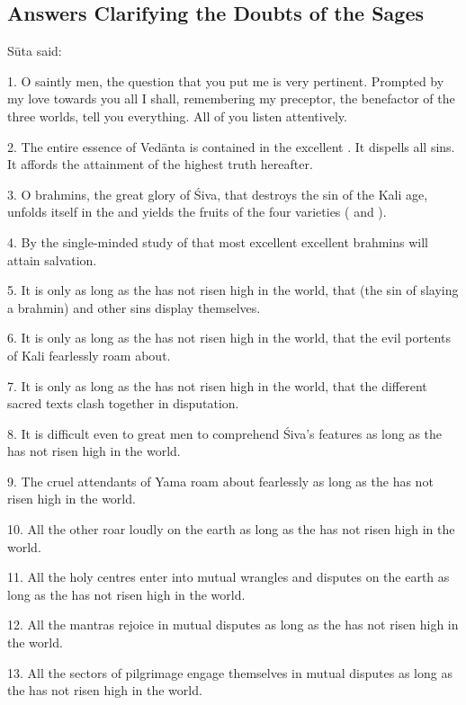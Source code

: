 \subsection{Answers Clarifying the Doubts of the Sages}

Sūta said:

1. O saintly men, the question that you put me is very pertinent. Prompted by my
love towards you all I shall, remembering my preceptor, the benefactor of the
three worlds, tell you everything. All of you listen attentively.

2. The entire essence of Vedānta is contained in the excellent .
It dispells all sins. It affords the attainment of the highest truth hereafter.

3. O brahmins, the great glory of Śiva, that destroys the sin of the Kali age,
unfolds itself in the  and yields the fruits of the four varieties
( and ).

4. By the single-minded study of that most excellent  excellent
brahmins will attain salvation.

5. It is only as long as the  has not risen high in the world,
that  (the sin of slaying a brahmin) and other sins display
themselves.

6. It is only as long as the  has not risen high in the world,
that the evil portents of Kali fearlessly roam about.

7. It is only as long as the  has not risen high in the world,
that the different sacred texts clash together in disputation.

8. It is difficult even to great men to comprehend Śiva’s features as long as
the  has not risen high in the world.

9. The cruel attendants of Yama roam about fearlessly as long as the
 has not risen high in the world.

10. All the other  roar loudly on the earth as long as the
 has not risen high in the world.

11. All the holy centres enter into mutual wrangles and disputes on the earth as
long as the  has not risen high in the world.

12. All the mantras rejoice in mutual disputes as long as the 
has not risen high in the world.

13. All the sectors of pilgrimage engage themselves in mutual disputes as long
as the  has not risen high in the world.

